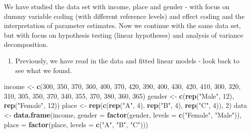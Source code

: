 \documentclass[
]{article}
\newenvironment{Shaded}{\begin{snugshade}}{\end{snugshade}}
\newcommand{\AttributeTok}[1]{\textcolor[rgb]{0.13,0.29,0.53}{#1}}
\newcommand{\DecValTok}[1]{\textcolor[rgb]{0.00,0.00,0.81}{#1}}
\newcommand{\FunctionTok}[1]{\textcolor[rgb]{0.13,0.29,0.53}{\textbf{#1}}}
\newcommand{\NormalTok}[1]{#1}
\newcommand{\OtherTok}[1]{\textcolor[rgb]{0.56,0.35,0.01}{#1}}
\newcommand{\StringTok}[1]{\textcolor[rgb]{0.31,0.60,0.02}{#1}}
\providecommand{\tightlist}{%
  \setlength{\itemsep}{0pt}\setlength{\parskip}{0pt}}
\begin{document}
We have studied the data set with income, place and gender - with focus
on dummy variable coding (with different reference levels) and effect
coding and the interpretation of parameter estimates. Now we continue
with the same data set, but with focus on hypothesis testing (linear
hypotheses) and analysis of variance decomposition.

\begin{enumerate}
\def\labelenumi{\arabic{enumi}.}
\tightlist
\item
  Previously, we have read in the data and fitted linear models - look
  back to see what we found.
\end{enumerate}

\begin{Shaded}
\begin{Highlighting}[]
\NormalTok{income }\OtherTok{\textless{}{-}} \FunctionTok{c}\NormalTok{(}\DecValTok{300}\NormalTok{, }\DecValTok{350}\NormalTok{, }\DecValTok{370}\NormalTok{, }\DecValTok{360}\NormalTok{, }\DecValTok{400}\NormalTok{, }\DecValTok{370}\NormalTok{, }\DecValTok{420}\NormalTok{, }\DecValTok{390}\NormalTok{, }\DecValTok{400}\NormalTok{, }\DecValTok{430}\NormalTok{, }\DecValTok{420}\NormalTok{, }\DecValTok{410}\NormalTok{,}
    \DecValTok{300}\NormalTok{, }\DecValTok{320}\NormalTok{, }\DecValTok{310}\NormalTok{, }\DecValTok{305}\NormalTok{, }\DecValTok{350}\NormalTok{, }\DecValTok{370}\NormalTok{, }\DecValTok{340}\NormalTok{, }\DecValTok{355}\NormalTok{, }\DecValTok{370}\NormalTok{, }\DecValTok{380}\NormalTok{, }\DecValTok{360}\NormalTok{, }\DecValTok{365}\NormalTok{)}
\NormalTok{gender }\OtherTok{\textless{}{-}} \FunctionTok{c}\NormalTok{(}\FunctionTok{rep}\NormalTok{(}\StringTok{"Male"}\NormalTok{, }\DecValTok{12}\NormalTok{), }\FunctionTok{rep}\NormalTok{(}\StringTok{"Female"}\NormalTok{, }\DecValTok{12}\NormalTok{))}
\NormalTok{place }\OtherTok{\textless{}{-}} \FunctionTok{rep}\NormalTok{(}\FunctionTok{c}\NormalTok{(}\FunctionTok{rep}\NormalTok{(}\StringTok{"A"}\NormalTok{, }\DecValTok{4}\NormalTok{), }\FunctionTok{rep}\NormalTok{(}\StringTok{"B"}\NormalTok{, }\DecValTok{4}\NormalTok{), }\FunctionTok{rep}\NormalTok{(}\StringTok{"C"}\NormalTok{, }\DecValTok{4}\NormalTok{)), }\DecValTok{2}\NormalTok{)}
\NormalTok{data }\OtherTok{\textless{}{-}} \FunctionTok{data.frame}\NormalTok{(income, }\AttributeTok{gender =} \FunctionTok{factor}\NormalTok{(gender, }\AttributeTok{levels =} \FunctionTok{c}\NormalTok{(}\StringTok{"Female"}\NormalTok{,}
    \StringTok{"Male"}\NormalTok{)), }\AttributeTok{place =} \FunctionTok{factor}\NormalTok{(place, }\AttributeTok{levels =} \FunctionTok{c}\NormalTok{(}\StringTok{"A"}\NormalTok{, }\StringTok{"B"}\NormalTok{, }\StringTok{"C"}\NormalTok{)))}
\end{Highlighting}
\end{Shaded}
\end{document}
